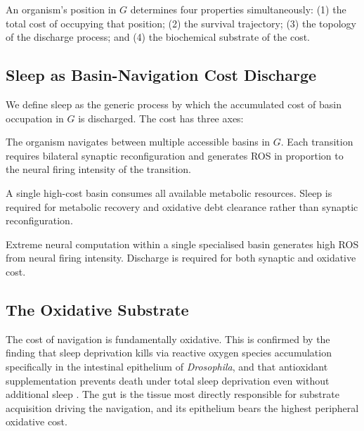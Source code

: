 \documentclass[10pt, a4paper]{article}
\begin{document}
An organism's position in $G$ determines
four properties simultaneously:
(1) the total cost of occupying that
position; (2) the survival trajectory;
(3) the topology of the discharge process;
and (4) the biochemical substrate of
the cost.

\subsection{Sleep as Basin-Navigation
Cost Discharge}

We define sleep as the generic process
by which the accumulated cost of
basin occupation in $G$ is discharged.
The cost has three axes:

\begin{description}[itemsep=0.3em]
  \item[Axis~1 --- Between-basin
    switching cost.] The organism
    navigates between multiple
    accessible basins in $G$.
    Each transition requires bilateral
    synaptic reconfiguration and
    generates ROS in proportion to
    the neural firing intensity of
    the transition.

  \item[Axis~2 --- Within-basin
    metabolic cost.] A single
    high-cost basin consumes all
    available metabolic resources.
    Sleep is required for metabolic
    recovery and oxidative debt
    clearance rather than synaptic
    reconfiguration.

  \item[Axis~3 --- Within-basin
    computational intensity.] Extreme
    neural computation within a single
    specialised basin generates high
    ROS from neural firing intensity.
    Discharge is required for both
    synaptic and oxidative cost.
\end{description}

\subsection{The Oxidative Substrate}

The cost of navigation is fundamentally
oxidative. This is confirmed by the
finding that sleep deprivation kills
via reactive oxygen species accumulation
specifically in the intestinal epithelium
of \textit{Drosophila}, and that
antioxidant supplementation prevents
death under total sleep deprivation even
without additional sleep
\cite{vaccaro2020sleep}. The gut is the
tissue most directly responsible for
substrate acquisition driving the
navigation, and its epithelium bears
the highest peripheral oxidative cost.
\end{document}
